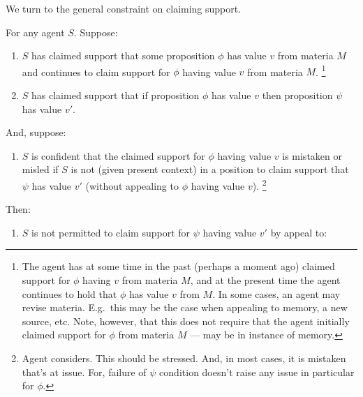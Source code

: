\begin{note}[\nI{}]
  We turn to the general constraint on claiming support.
  \begin{proposition}[\nI{-}  --- \nI{}]\label{prem:ni}
    For any agent \(S\).
    Suppose:
    \begin{enumerate}[ref=(\textsf{NI}:\arabic*), series=nI_counter]
    \item\label{nI:claimed-support} \(S\) has claimed support that some proposition \(\phi\) has value \(v\) from materia \(M\) and continues to claim support for \(\phi\) having value \(v\) from materia \(M\).\nolinebreak
      \footnote{
        The agent has at some time in the past (perhaps a moment ago) claimed support for \(\phi\) having \(v\) from materia \(M\), and at the present time the agent continues to hold that \(\phi\) has value \(v\) from \(M\).
        In some cases, an agent may revise materia.
        E.g.\ this may be the case when appealing to memory, a new source, etc.
        Note, however, that this does not require that the agent initially claimed support for \(\phi\) from materia \(M\) --- may be in instance of memory.
      }
    \item\label{nI:received-info} \(S\) has claimed support that if proposition \(\phi\) has value \(v\) then proposition \(\psi\) has value \(v'\).
    \end{enumerate}
    And, suppose:
    \begin{enumerate}[ref=(\textsf{NI}:\arabic*), resume*=nI_counter]
    \item\label{nI:inclusion} \(S\) is confident that the claimed support for \(\phi\) having value \(v\) is mistaken or misled if \(S\) is not (given present context) in a position to claim support that \(\psi\) has value \(v'\) (without appealing to \(\phi\) having value \(v\)).\nolinebreak
      \footnote{
        Agent considers.
        This should be stressed.
        And, in most cases, it is mistaken that's at issue.
        For, failure of \(\psi\) condition doesn't raise any issue in particular for \(\phi\).
      }
    \end{enumerate}
    Then:
    \begin{enumerate}[ref=(\textsf{NI}:\arabic*), resume*=nI_counter]
    \item\label{nI:going-by-value} \(S\) is not permitted to claim support for \(\psi\) having value \(v'\) by appeal to:
    \end{enumerate}
    \vspace{-\topsep}\vspace{-\topsep}
  \end{proposition}
\end{note}



